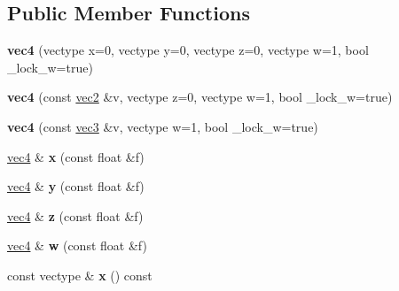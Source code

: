 \subsection*{Public Member Functions}
\begin{DoxyCompactItemize}
\item 
\hypertarget{structj3d_1_1vec4_a4e08ee837f9ebb73470d97a7bec90f2c}{}{\bfseries vec4} (vectype x=0, vectype y=0, vectype z=0, vectype w=1, bool \+\_\+lock\+\_\+w=true)\label{structj3d_1_1vec4_a4e08ee837f9ebb73470d97a7bec90f2c}

\item 
\hypertarget{structj3d_1_1vec4_af6774e810f79c7ecae98a308d97e444c}{}{\bfseries vec4} (const \hyperlink{structj3d_1_1vec2}{vec2} \&v, vectype z=0, vectype w=1, bool \+\_\+lock\+\_\+w=true)\label{structj3d_1_1vec4_af6774e810f79c7ecae98a308d97e444c}

\item 
\hypertarget{structj3d_1_1vec4_a09c6438990cb279b33abd449b95cd864}{}{\bfseries vec4} (const \hyperlink{structj3d_1_1vec3}{vec3} \&v, vectype w=1, bool \+\_\+lock\+\_\+w=true)\label{structj3d_1_1vec4_a09c6438990cb279b33abd449b95cd864}

\item 
\hypertarget{structj3d_1_1vec4_a80505b925cd959e0700407b5feadc8b3}{}\hyperlink{structj3d_1_1vec4}{vec4} \& {\bfseries x} (const float \&f)\label{structj3d_1_1vec4_a80505b925cd959e0700407b5feadc8b3}

\item 
\hypertarget{structj3d_1_1vec4_a04ad2fa091cb867f4cbb7b599d089e74}{}\hyperlink{structj3d_1_1vec4}{vec4} \& {\bfseries y} (const float \&f)\label{structj3d_1_1vec4_a04ad2fa091cb867f4cbb7b599d089e74}

\item 
\hypertarget{structj3d_1_1vec4_aba2ded6c3ad1b9e6599369f5a80e885b}{}\hyperlink{structj3d_1_1vec4}{vec4} \& {\bfseries z} (const float \&f)\label{structj3d_1_1vec4_aba2ded6c3ad1b9e6599369f5a80e885b}

\item 
\hypertarget{structj3d_1_1vec4_ab32093e144e71bc1f80f4de78dbfbc75}{}\hyperlink{structj3d_1_1vec4}{vec4} \& {\bfseries w} (const float \&f)\label{structj3d_1_1vec4_ab32093e144e71bc1f80f4de78dbfbc75}

\item 
\hypertarget{structj3d_1_1vec4_a7ed8bcee27c5951125a23001ce66f050}{}const vectype \& {\bfseries x} () const \label{structj3d_1_1vec4_a7ed8bcee27c5951125a23001ce66f050}


\end{DoxyCompactItemize}
